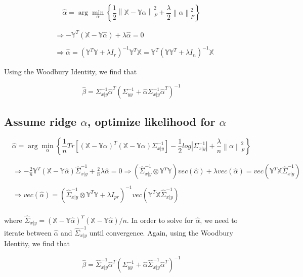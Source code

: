 \documentclass[11pt,]{book}
\theoremstyle{definition}
\theoremstyle{definition}
\theoremstyle{definition}
\theoremstyle{remark}
\begin{document}
\[ \hat{\alpha} = \arg\min_{\alpha}\left\{\frac{1}{2} \left\| \mathbb{X} - \mathbb{Y}\alpha \right\|_{F}^{2} + \frac{\lambda}{2}\left\| \alpha \right\|_{F}^{2}\right\} \]

\begin{align*}
  &\Rightarrow -\mathbb{Y}^{T}\left( \mathbb{X} - \mathbb{Y}\hat{\alpha} \right) + \lambda\hat{\alpha} = 0 \\
  & \\
  &\Rightarrow \hat{\alpha} = \left( \mathbb{Y}^{T}\mathbb{Y} + \lambda I_{r} \right)^{-1}\mathbb{Y}^{T}\mathbb{X} = \mathbb{Y}^{T}\left( \mathbb{Y}\mathbb{Y}^{T} + \lambda I_{n} \right)^{-1}\mathbb{X}
\end{align*}

Using the Woodbury Identity, we find that

\[ \hat{\beta} = \Sigma_{x | y}^{-1}\hat{\alpha}^{T}\left( \Sigma_{yy}^{-1} + \hat{\alpha}\Sigma_{x | y}^{-1}\hat{\alpha}^{T} \right)^{-1} \]

\vspace{0.5cm}

\hypertarget{assume-ridge-alpha-optimize-likelihood-for-alpha}{%
\subsection{\texorpdfstring{Assume ridge \(\alpha\), optimize likelihood
for
\(\alpha\)}{Assume ridge \textbackslash{}alpha, optimize likelihood for \textbackslash{}alpha}}\label{assume-ridge-alpha-optimize-likelihood-for-alpha}}

\[ \hat{\alpha} = \arg\min_{\alpha}\left\{ \frac{1}{n} Tr\left[ \left(\mathbb{X} - \mathbb{Y}\alpha \right)^{T}\left( \mathbb{X} - \mathbb{Y}\alpha \right)\Sigma_{x | y}^{-1} \right] - \frac{1}{2}log\left| \Sigma_{x | y}^{-1} \right| + \frac{\lambda}{n}\left\| \alpha \right\|_{F}^{2} \right\} \]

\begin{align*}
  &\Rightarrow -\frac{2}{n}\mathbb{Y}^{T}\left( \mathbb{X} - \mathbb{Y}\hat{\alpha} \right)\hat{\Sigma}_{x | y}^{-1} + \frac{2}{n}\lambda\hat{\alpha} = 0 \Rightarrow \left( \hat{\Sigma}_{x | y}^{-1} \otimes \mathbb{Y}^{T}\mathbb{Y} \right)vec\left( \hat{\alpha} \right) + \lambda vec\left( \hat{\alpha} \right) = vec\left( \mathbb{Y}^{T}\mathbb{X}\hat{\Sigma}_{x | y}^{-1} \right) \\
  & \\
  &\Rightarrow vec\left( \hat{\alpha} \right) = \left( \hat{\Sigma}_{x | y}^{-1} \otimes \mathbb{Y}^{T}\mathbb{Y} + \lambda I_{pr} \right)^{-1}vec\left( \mathbb{Y}^{T}\mathbb{X}\hat{\Sigma}_{x | y}^{-1} \right) \\
\end{align*}

where
\(\hat{\Sigma}_{x | y} = (\mathbb{X} - \mathbb{Y}\hat{\alpha} )^{T}(\mathbb{X} - \mathbb{Y}\hat{\alpha})/n\).
In order to solve for \(\hat{\alpha}\), we need to iterate between
\(\hat{\alpha}\) and \(\hat{\Sigma}_{x | y}^{-1}\) until convergence.
Again, using the Woodbury Identity, we find that

\[ \hat{\beta} = \hat{\Sigma}_{x | y}^{-1}\hat{\alpha}^{T}\left( \Sigma_{yy}^{-1} + \hat{\alpha}\hat{\Sigma}_{x | y}^{-1}\hat{\alpha}^{T} \right)^{-1} \]


\end{document}
